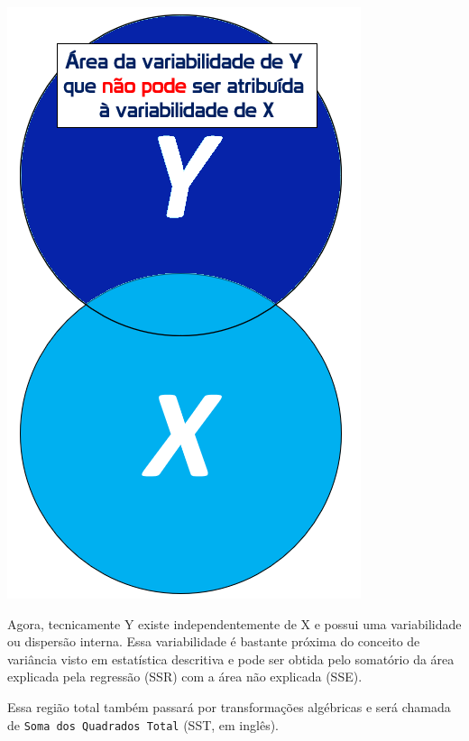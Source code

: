 \documentclass[
]{book}
\begin{document}
\includegraphics{./img/cap_reg_x_y_SSE.png}

Agora, tecnicamente Y existe independentemente de X e possui uma variabilidade ou dispersão interna. Essa variabilidade é bastante próxima do conceito de variância visto em estatística descritiva e pode ser obtida pelo somatório da área explicada pela regressão (SSR) com a área não explicada (SSE).

Essa região total também passará por transformações algébricas e será chamada de \texttt{Soma\ dos\ Quadrados\ Total} (SST, em inglês).
\end{document}
